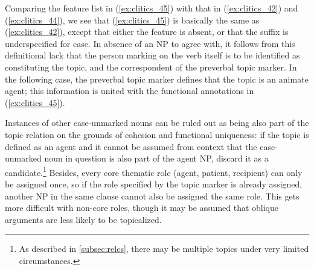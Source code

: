 Comparing the feature list in (\ref{ex:clitics_45}) with that in
(\ref{ex:clitics_42}) and (\ref{ex:clitics_44}), we see that
(\ref{ex:clitics_45}) is basically the same as (\ref{ex:clitics_42}), except
that either the \Case{} feature is absent, or that the suffix is
underspecified for case. In absence of an NP to agree with, it follows from
this definitional lack that the person marking on the verb itself is to be
identified as constituting the topic, and the correspondent of the preverbal
topic marker. In the following case, the preverbal topic marker defines that
the topic is an animate agent; this information is united with the functional
annotations in (\ref{ex:clitics_45}).

\begin{figure}[h]
\begin{morphlex}
\ex\label{ex:clitics_46}
\xe
\end{morphlex}
\end{figure}

Instances of other case-unmarked nouns can be ruled out as being also part of
the topic relation on the grounds of cohesion and functional uniqueness: if the
topic is defined as an agent and it cannot be assumed from context that the
case-unmarked noun in question is also part of the agent NP, discard it as a
candidate.\footnote{As described in \autoref{subsec:relcs}, there may be
multiple topics under very limited circumstances.} Besides, every core thematic
role (agent, patient, recipient) can only be assigned once, so if the role
specified by the topic marker is already assigned, another NP in the same
clause cannot also be assigned the same role. This gets more difficult with
non-core roles, though it may be assumed that oblique arguments are less likely
to be topicalized.

